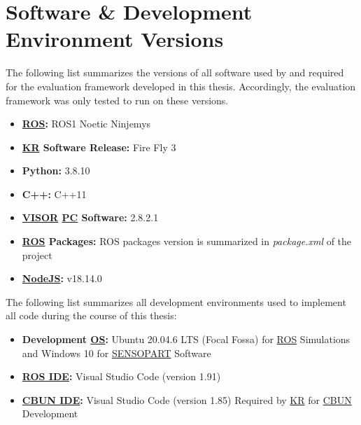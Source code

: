 \section{Software \& Development Environment Versions}

The following list summarizes the versions of all software used by and required for the
evaluation framework developed in this thesis. Accordingly, the evaluation framework
was only tested to run on these versions.

\begin{itemize}
    \item \textbf{\hyperref[tab:acronyms]{ROS}:} ROS1 Noetic Ninjemys
    \item \textbf{\hyperref[tab:acronyms]{KR} Software Release:} Fire Fly 3
    \item \textbf{Python:} 3.8.10
    \item \textbf{C++:} C++11
    \item \textbf{\hyperref[tab:acronyms]{VISOR\textsuperscript{\textregistered}} \hyperref[tab:acronyms]{PC} Software:} 2.8.2.1
    \item \textbf{\hyperref[tab:acronyms]{ROS} Packages:} ROS packages version is summarized in \textit{package.xml} of the project
    \item \textbf{\hyperref[tab:acronyms]{NodeJS}:} v18.14.0
\end{itemize}

The following list summarizes all development environments used to implement all code
during the course of this thesis:

\begin{itemize}
    \item \textbf{Development \hyperref[tab:acronyms]{OS}:} Ubuntu 20.04.6 LTS (Focal Fossa) for \hyperref[tab:acronyms]{ROS} Simulations and Windows 10 for \hyperref[tab:acronyms]{SENSOPART} Software
    \item \textbf{\hyperref[tab:acronyms]{ROS IDE}:} Visual Studio Code (version 1.91)
    \item \textbf{\hyperref[tab:acronyms]{CBUN IDE}:} Visual Studio Code (version 1.85) Required by \hyperref[tab:acronyms]{KR} for \hyperref[tab:acronyms]{CBUN} Development
\end{itemize}

\newpage
